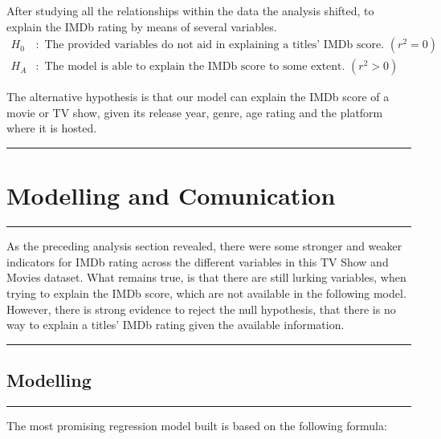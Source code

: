 \documentclass[
]{article}
\begin{document}
After studying all the relationships within the data the analysis
shifted, to explain the IMDb rating by means of several variables. \[
\begin{aligned}
H_0 &: \text{ The provided variables do not aid in explaining a titles’ IMDb score. } (r^2 =0) \\
H_A &: \text{ The model is able to explain the IMDb score to some extent. }(r^2 >0)
\end{aligned}
\]

The alternative hypothesis is that our model can explain the IMDb score
of a movie or TV show, given its release year, genre, age rating and the
platform where it is hosted.

\begin{center}\rule{0.5\linewidth}{0.5pt}\end{center}

\hypertarget{modelling-and-comunication}{%
\section{Modelling and Comunication}\label{modelling-and-comunication}}

\begin{center}\rule{0.5\linewidth}{0.5pt}\end{center}

As the preceding analysis section revealed, there were some stronger and
weaker indicators for IMDb rating across the different variables in this
TV Show and Movies dataset. What remains true, is that there are still
lurking variables, when trying to explain the IMDb score, which are not
available in the following model.\\
However, there is strong evidence to reject the null hypothesis, that
there is no way to explain a titles' IMDb rating given the available
information.

\begin{center}\rule{0.5\linewidth}{0.5pt}\end{center}

\hypertarget{modelling}{%
\subsection{Modelling}\label{modelling}}

\begin{center}\rule{0.5\linewidth}{0.5pt}\end{center}

The most promising regression model built is based on the following
formula:
\end{document}
